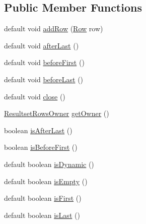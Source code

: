 \subsection*{Public Member Functions}
\begin{DoxyCompactItemize}
\item 
default void \mbox{\hyperlink{interfacecom_1_1mysql_1_1cj_1_1protocol_1_1_resultset_rows_a0af5754ee23ac440b3ce31543ed3c339}{add\+Row}} (\mbox{\hyperlink{interfacecom_1_1mysql_1_1cj_1_1result_1_1_row}{Row}} row)
\item 
default void \mbox{\hyperlink{interfacecom_1_1mysql_1_1cj_1_1protocol_1_1_resultset_rows_a9b69d770817c03e132e2561a228e5951}{after\+Last}} ()
\item 
default void \mbox{\hyperlink{interfacecom_1_1mysql_1_1cj_1_1protocol_1_1_resultset_rows_ae7c525fda08befaf356a5a0df5c78086}{before\+First}} ()
\item 
default void \mbox{\hyperlink{interfacecom_1_1mysql_1_1cj_1_1protocol_1_1_resultset_rows_a5e79d9c2bb5bcfb947e02b71121d74d2}{before\+Last}} ()
\item 
default void \mbox{\hyperlink{interfacecom_1_1mysql_1_1cj_1_1protocol_1_1_resultset_rows_aae10da1813382e04a356d4e282d1a7f9}{close}} ()
\item 
\mbox{\hyperlink{interfacecom_1_1mysql_1_1cj_1_1protocol_1_1_resultset_rows_owner}{Resultset\+Rows\+Owner}} \mbox{\hyperlink{interfacecom_1_1mysql_1_1cj_1_1protocol_1_1_resultset_rows_a495e468d6fb9aee61f47343ab45cdd52}{get\+Owner}} ()
\item 
boolean \mbox{\hyperlink{interfacecom_1_1mysql_1_1cj_1_1protocol_1_1_resultset_rows_a8599e016249b697a11560806dc290a87}{is\+After\+Last}} ()
\item 
boolean \mbox{\hyperlink{interfacecom_1_1mysql_1_1cj_1_1protocol_1_1_resultset_rows_a748205e182d8b1b1263ebe78c7062517}{is\+Before\+First}} ()
\item 
default boolean \mbox{\hyperlink{interfacecom_1_1mysql_1_1cj_1_1protocol_1_1_resultset_rows_aa9dd39e935202eca58365a9f0c166db8}{is\+Dynamic}} ()
\item 
default boolean \mbox{\hyperlink{interfacecom_1_1mysql_1_1cj_1_1protocol_1_1_resultset_rows_ae130183c4bba57a93d3fe890f14b6c25}{is\+Empty}} ()
\item 
default boolean \mbox{\hyperlink{interfacecom_1_1mysql_1_1cj_1_1protocol_1_1_resultset_rows_ae7d5b7ca8787eaca7ee5e0ca69ac2818}{is\+First}} ()
\item 
default boolean \mbox{\hyperlink{interfacecom_1_1mysql_1_1cj_1_1protocol_1_1_resultset_rows_ae52ab20020adafaf87c2f45bae82980d}{is\+Last}} ()

\end{DoxyCompactItemize}
